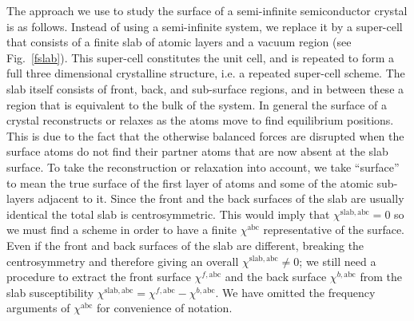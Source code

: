 \documentclass[floatfix,prb,aps,superscriptaddress,showpacs,11pt,preprint,letterpaper]{revtex4}
\begin{document}

The approach we use to study the surface of a semi-infinite
semiconductor crystal is as follows. Instead of using a
semi-infinite system, we replace it by a super-cell that 
consists of a finite
slab of atomic layers and a vacuum region (see Fig.~\ref{fslab}). This
super-cell constitutes the unit cell, and
is repeated to form a full three dimensional crystalline structure,
i.e. a repeated super-cell scheme. 
The slab itself consists of front, back, and 
sub-surface regions, and in between these
a region that is equivalent to the
bulk of the system. 
In general the surface of a crystal reconstructs or relaxes as the atoms
move to find equilibrium positions. This is due to the fact that
the otherwise
balanced forces are disrupted when the surface atoms do not find their 
partner atoms that are now absent at the slab surface.
To take the reconstruction or relaxation into account, 
we take ``surface'' to mean
the true surface of the first layer of atoms and
some of the atomic sub-layers adjacent to it.
Since the front and the back
surfaces of the slab are usually identical the total slab is
centrosymmetric. This would imply that 
$\chi^{\mathrm{slab},\mathrm{a}\mathrm{b}\mathrm{c}}=0$ so we must
find a scheme 
in order to have a finite $\chi^{\mathrm{a}\mathrm{b}\mathrm{c}}$ representative of the
surface. Even if the front and back surfaces of the slab 
are different, breaking the centrosymmetry and therefore giving an
overall $\chi^{\mathrm{slab},\mathrm{a}\mathrm{b}\mathrm{c}}\ne 0$; we still
need a procedure to extract the front surface $\chi^{f,\mathrm{a}\mathrm{b}\mathrm{c}}$
and the back surface $\chi^{b,\mathrm{a}\mathrm{b}\mathrm{c}}$ from the slab
susceptibility 
$\chi^{\mathrm{slab},\mathrm{a}\mathrm{b}\mathrm{c}}=\chi^{f,\mathrm{a}\mathrm{b}\mathrm{c}}-\chi^{b,\mathrm{a}\mathrm{b}\mathrm{c}}$.
We have omitted the frequency arguments of $\chi^{\mathrm{a}\mathrm{b}\mathrm{c}}$ for 
convenience of notation.
\end{document}

